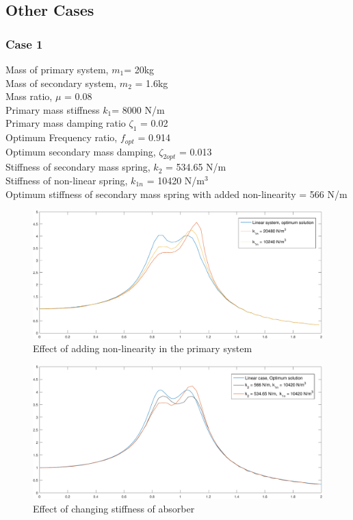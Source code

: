 \subsection{Other Cases}
\subsubsection{Case 1}
Mass of primary system, $m_1$= 20kg\\
Mass of secondary system, $m_2$ = 1.6kg\\
Mass ratio, $\mu$ = 0.08\\
Primary mass stiffness $k_1$= 8000 N/m\\
Primary mass damping ratio $\zeta_1$ = 0.02\\
Optimum Frequency ratio, $f_{opt}$ = 0.914\\
Optimum secondary mass damping, $\zeta_{2opt}$ = 0.013\\
Stiffness of secondary mass spring, $k_2$ = 534.65 N/m \\
Stiffness of non-linear spring, $k_{1n}$ = 10420 N/m$^3$\\
Optimum stiffness of secondary mass spring with added non-linearity = 566 N/m
\begin{figure}[h!]
\includegraphics[width=\textwidth, height = 0.5\textwidth]{"figures/2addingNonlinearity"}
\caption{Effect of adding non-linearity in the primary system}
\end{figure}

\begin{figure}[h!]
\includegraphics[width=\textwidth, height = 0.5\textwidth]{"figures/2changingk2"}
\caption{Effect of changing stiffness of absorber}
\end{figure}

